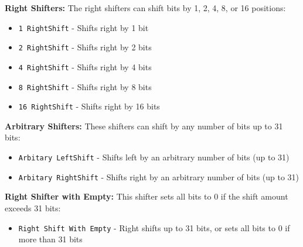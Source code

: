 \documentclass[a4paper,12pt]{article}
\begin{document}
\textbf{Right Shifters:} The right shifters can shift bits by 1, 2, 4, 8, or 16 positions:
\begin{itemize}
    \item \texttt{1 RightShift} - Shifts right by 1 bit
    \item \texttt{2 RightShift} - Shifts right by 2 bits
    \item \texttt{4 RightShift} - Shifts right by 4 bits
    \item \texttt{8 RightShift} - Shifts right by 8 bits
    \item \texttt{16 RightShift} - Shifts right by 16 bits
\end{itemize}

\textbf{Arbitrary Shifters:} These shifters can shift by any number of bits up to 31 bits:
\begin{itemize}
    \item \texttt{Arbitary LeftShift} - Shifts left by an arbitrary number of bits (up to 31)
    \item \texttt{Arbitary RightShift} - Shifts right by an arbitrary number of bits (up to 31)
\end{itemize}

\textbf{Right Shifter with Empty:} This shifter sets all bits to 0 if the shift amount exceeds 31 bits:
\begin{itemize}
    \item \texttt{Right Shift With Empty} - Right shifts up to 31 bits, or sets all bits to 0 if more than 31 bits
\end{itemize}
\end{document}
